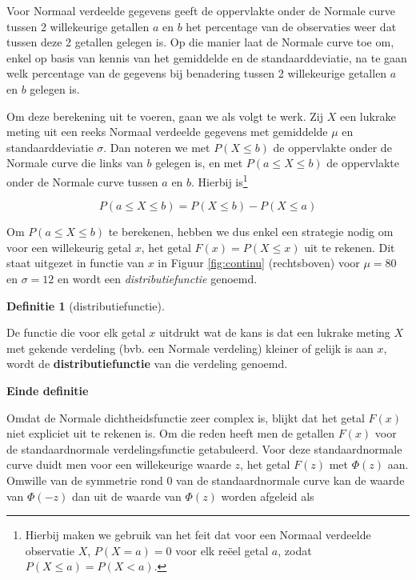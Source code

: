 \documentclass[
  12pt,dutch,coursenotes]{book}
\theoremstyle{definition}
\newtheorem{definition}{Definitie}[chapter]
\theoremstyle{definition}
\theoremstyle{definition}
\theoremstyle{remark}
\begin{document}
Voor Normaal verdeelde gegevens geeft de oppervlakte onder de Normale curve
tussen 2 willekeurige getallen \(a\) en \(b\) het percentage van de
observaties weer dat tussen deze 2 getallen gelegen is. Op die manier laat de
Normale curve toe om, enkel op basis van kennis van het gemiddelde en de
standaarddeviatie, na te gaan welk percentage van de gegevens bij benadering
tussen 2 willekeurige getallen \(a\) en \(b\) gelegen is.

Om deze berekening uit te voeren, gaan we als volgt te werk. Zij \(X\) een
lukrake meting uit een reeks Normaal verdeelde gegevens met gemiddelde \(\mu\)
en standaarddeviatie \(\sigma\). Dan noteren we met \(P(X\leq b)\) de
oppervlakte onder de Normale curve die links van \(b\) gelegen is, en met \(P(a\leq X\leq b)\) de oppervlakte onder de Normale curve tussen \(a\) en \(b\).
Hierbij is\footnote{Hierbij maken we gebruik van het feit dat voor een Normaal verdeelde observatie \(X\), \(P(X=a)=0\) voor elk reëel getal \(a\), zodat \(P(X\leq a)=P(X<a)\).}

\begin{equation*}
P(a\leq X\leq b)=P(X\leq b)-P(X\leq a)
\end{equation*}

Om \(P(a\leq X\leq b)\) te berekenen, hebben we dus enkel een strategie nodig
om voor een willekeurig getal \(x\), het getal \(F(x) = P(X \leq x)\) uit te
rekenen. Dit staat uitgezet in functie van \(x\) in Figuur \ref{fig:continu}
(rechtsboven) voor \(\mu=80\) en \(\sigma=12\) en wordt een \emph{distributiefunctie} genoemd.

\begin{definition}[distributiefunctie]
\protect\hypertarget{def:unnamed-chunk-41}{}{\label{def:unnamed-chunk-41} \iffalse (distributiefunctie) \fi{} }
\end{definition}
De functie die voor elk getal \(x\) uitdrukt wat de kans is dat een lukrake
meting \(X\) met gekende verdeling (bvb. een Normale verdeling) kleiner of
gelijk is aan \(x\), wordt de \textbf{distributiefunctie} van die verdeling
genoemd.

\textbf{Einde definitie}

Omdat de Normale dichtheidsfunctie zeer complex is, blijkt dat het getal \(F(x)\) niet expliciet uit te rekenen is. Om die reden heeft men de getallen \(F(x)\)
voor de standaardnormale verdelingsfunctie getabuleerd. Voor
deze standaardnormale curve duidt men voor een willekeurige waarde \(z\), het
getal \(F(z)\) met \(\Phi(z)\) aan. Omwille van de symmetrie rond 0 van de
standaardnormale curve kan de waarde van \(\Phi(-z)\) dan uit de waarde van \(\Phi(z)\) worden afgeleid als
\end{document}
